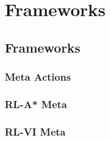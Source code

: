 \chapter{Frameworks}
\label{chapter4}


\section{Frameworks}


\subsection{Meta Actions}

\subsection{RL-A* Meta}

\subsection{RL-VI Meta}
